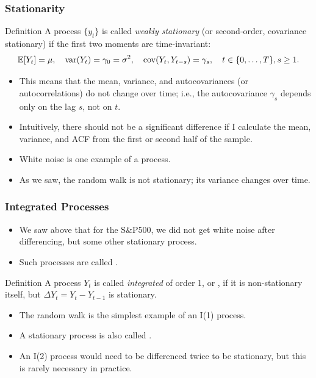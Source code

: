 \begin{frame}\frametitle{Stationarity}%
\begin{block}{Definition}
A process $\{y_{t}\}$ is called \emph{\color{red} weakly stationary} (or second-order, covariance stationary) if
the first two moments are time-invariant:%
\begin{equation*}
{\mathbb E}[Y_{t}]=\mu ,\quad \mathop{\rm var}(Y_{t})=\gamma_0=\sigma^2, \quad \mathop{\rm cov}(Y_{t},Y_{t-s })=\gamma _{s },\quad
 t\in \{0,\ldots, T\},s \geq 1.
\end{equation*}%
\end{block}
\begin{itemize}
\item This means that the mean, variance, and autocovariances (or autocorrelations) do not change over time; i.e., the autocovariance $\gamma_s$ depends only on the lag $s$, not on $t$.
\item Intuitively, there should not be a significant difference if I calculate the mean, variance, and ACF from the first or second half of the sample.
\item White noise is one example of a  process.
\item As we saw, the random walk is not stationary; its variance changes over time.
\end{itemize}
\end{frame}%
\begin{frame}
\frametitle{Integrated Processes}
\begin{itemize}
\item We saw above that for the S\&P500, we did not get white noise after differencing, but some other stationary process.
\item Such processes are called .
\end{itemize}
\begin{block}{Definition}
A process $Y_t$ is called \emph{\color{red}integrated} of order 1, or , if it
is non-stationary itself, but $\Delta Y_t = Y_t - Y_{t-1}$ is stationary.
\end{block}
\begin{itemize}
\item The random walk is the simplest example of an I(1) process.
\item A stationary process is also called .
\item An I(2) process would need to be differenced twice to be stationary, but this is rarely necessary in practice.
\end{itemize}
\end{frame}
